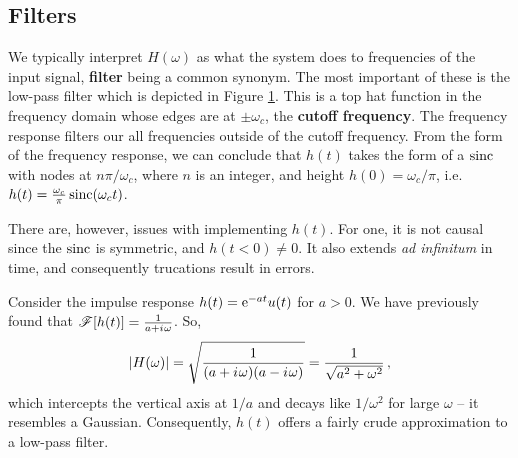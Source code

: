\subsection{Filters}
%
We typically interpret $H(\omega)$ as what the system does to frequencies of the
input signal, \textbf{filter} being a common synonym. The most important of these
is the low-pass filter which is depicted in Figure \ref{fig::lecture_6_low_pass_filter}.
This is a top hat function in the frequency domain whose edges are at $\pm\omega_c$, the
\textbf{cutoff frequency}. The frequency response filters our all frequencies
outside of the cutoff frequency. From the form of the frequency response, we can
conclude that $h(t)$ takes the form of a $\operatorname{sinc}$ with nodes at $n\pi/\omega_c$, where
$n$ is an integer, and height $h(0) = \omega_c/\pi$, i.e.
$h(t) = \frac{\omega_c}{\pi}\operatorname{sinc}(\omega_c t)$.
%
\begin{figure}[!htb]
  \caption{
  }
  \label{fig::lecture_6_low_pass_filter}
\end{figure}
%
There are, however, issues with implementing $h(t)$. For one, it is not causal
since the $\operatorname{sinc}$ is symmetric, and $h(t<0) \neq 0$. It also extends
\textit{ad infinitum} in time, and consequently trucations result in errors.
%
\begin{exmp}
  Consider the impulse response $h(t) =\mathrm{e}^{-at}u(t)$ for $a>0$. We have previously
  found that $\mathscr{F}[h(t)] = \frac{1}{a + {i\mkern1mu}\omega}$. So,
  \begin{displaymath}
    |H(\omega)| = \sqrt{\frac{1}{(a + {i\mkern1mu}\omega)(a - {i\mkern1mu}\omega)}}
    = \frac{1}{\sqrt{a^2 + \omega^2}} \,,
  \end{displaymath}
  which intercepts the vertical axis at $1/a$ and decays like $1/\omega^2$ for
  large $\omega$ -- it resembles a Gaussian. Consequently, $h(t)$ offers
  a fairly crude approximation to a low-pass filter.
\end{exmp}

